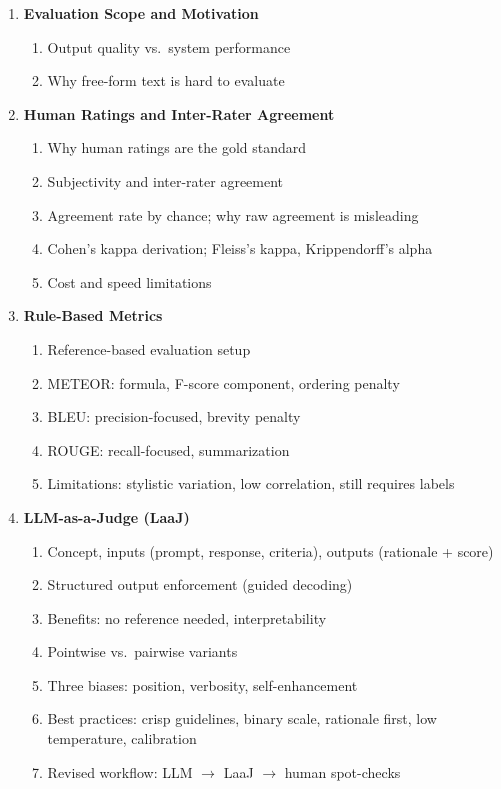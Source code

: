 \documentclass[11pt, a4paper]{article}
\begin{document}
\begin{enumerate}[label=\textbf{\arabic*.}, leftmargin=2em]
  \item \textbf{Evaluation Scope and Motivation}
    \begin{enumerate}[label=\arabic{enumi}.\arabic*]
      \item Output quality vs.\ system performance
      \item Why free-form text is hard to evaluate
    \end{enumerate}

  \item \textbf{Human Ratings and Inter-Rater Agreement}
    \begin{enumerate}[label=\arabic{enumi}.\arabic*]
      \item Why human ratings are the gold standard
      \item Subjectivity and inter-rater agreement
      \item Agreement rate by chance; why raw agreement is misleading
      \item Cohen's kappa derivation; Fleiss's kappa, Krippendorff's alpha
      \item Cost and speed limitations
    \end{enumerate}

  \item \textbf{Rule-Based Metrics}
    \begin{enumerate}[label=\arabic{enumi}.\arabic*]
      \item Reference-based evaluation setup
      \item METEOR: formula, F-score component, ordering penalty
      \item BLEU: precision-focused, brevity penalty
      \item ROUGE: recall-focused, summarization
      \item Limitations: stylistic variation, low correlation, still requires labels
    \end{enumerate}

  \item \textbf{LLM-as-a-Judge (LaaJ)}
    \begin{enumerate}[label=\arabic{enumi}.\arabic*]
      \item Concept, inputs (prompt, response, criteria), outputs (rationale + score)
      \item Structured output enforcement (guided decoding)
      \item Benefits: no reference needed, interpretability
      \item Pointwise vs.\ pairwise variants
      \item Three biases: position, verbosity, self-enhancement
      \item Best practices: crisp guidelines, binary scale, rationale first, low temperature, calibration
      \item Revised workflow: LLM $\to$ LaaJ $\to$ human spot-checks
    \end{enumerate}


\end{enumerate}
\end{document}
